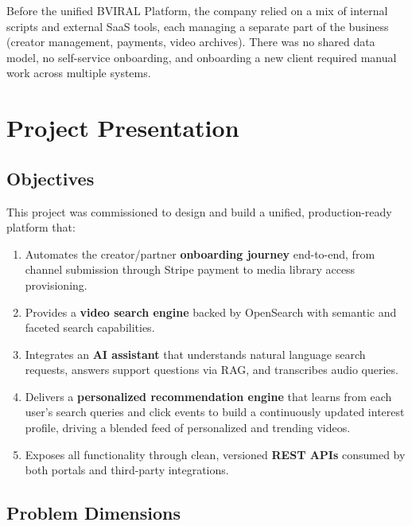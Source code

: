 Before the unified BVIRAL Platform, the company relied on a mix of internal scripts and external
SaaS tools, each managing a separate part of the business (creator management, payments, video
archives). There was no shared data model, no self-service onboarding, and onboarding a new client
required manual work across multiple systems.

\section{Project Presentation}

\subsection{Objectives}

This project was commissioned to design and build a unified, production-ready platform that:

\begin{enumerate}
  \item Automates the creator/partner \textbf{onboarding journey} end-to-end, from channel
    submission through Stripe payment to media library access provisioning.
  \item Provides a \textbf{video search engine} backed by OpenSearch with semantic and faceted
    search capabilities.
  \item Integrates an \textbf{AI assistant} that understands natural language search requests,
    answers support questions via RAG, and transcribes audio queries.
  \item Delivers a \textbf{personalized recommendation engine} that learns from each user's
    search queries and click events to build a continuously updated interest profile, driving
    a blended feed of personalized and trending videos.
  \item Exposes all functionality through clean, versioned \textbf{REST APIs} consumed by both
    portals and third-party integrations.
\end{enumerate}

\subsection{Problem Dimensions}

